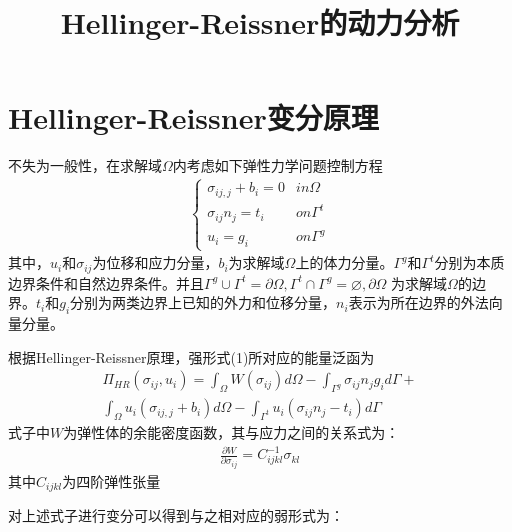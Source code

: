 \documentclass[11pt,a4paper]{article}
\begin{document}
\title{Hellinger-Reissner的动力分析}
\date{}
\maketitle
\section{Hellinger-Reissner变分原理}
不失为一般性，在求解域$\Omega$内考虑如下弹性力学问题控制方程
\begin{displaymath}  
\begin{equation}
    \begin{split}
    \begin{cases}
        \sigma_{ij,j}+b_i=0&in\Omega\\
        \sigma_{ij}n_j=t_i&on\Gamma^t\\
        u_i=g_i&on\Gamma^g
    \end{cases}
\end{split}
\end{equation}
\end{displaymath}
其中，$u_i$和$\sigma_{ij}$为位移和应力分量，$b_i$为求解域$\Omega$上的体力分量。$\Gamma^g$和$\Gamma^t$分别为本质边界条件和自然边界条件。并且$\Gamma^g\cup\Gamma^t=\partial\Omega,\Gamma^t\cap\Gamma^g=\varnothing,\partial\Omega$
为求解域$\Omega$的边界。$t_i$和$g_i$分别为两类边界上已知的外力和位移分量，$n_i$表示为所在边界的外法向量分量。\par
根据Hellinger-Reissner原理，强形式(1)所对应的能量泛函为
\begin{displaymath}
\begin{equation}
    \begin{split}
\Pi_{H\!R}(\sigma_{ij},u_i)=\int_{\Omega}W(\sigma_{ij})d\Omega-\int_{\Gamma^g}\sigma_{ij}n_jg_id\Gamma+\\\int_{\Omega}u_i(\sigma_{ij,j}+b_i)d\Omega-\int_{\Gamma^t}u_i(\sigma_{ij}n_j-t_i)d\Gamma
    \end{split}
\end{equation}
\end{displaymath}
式子中$W$为弹性体的余能密度函数，其与应力之间的关系式为：
\begin{displaymath}
\begin{equation}
    \begin{split}
        \frac{\partial W}{\partial \sigma_{ij}}=C^{-1}_{ijkl}\sigma_{kl}
    \end{split}
\end{equation}
\end{displaymath}
其中$C_{ijkl}$为四阶弹性张量\par
对上述式子进行变分可以得到与之相对应的弱形式为：
\end{document}
